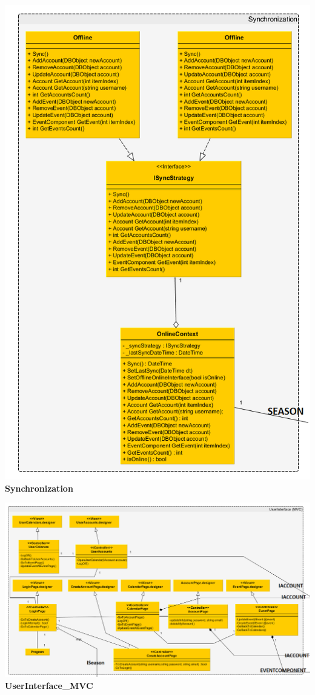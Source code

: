 \documentclass[a4paper]{article}
\begin{document}
\begin{table}
\centering
	\includegraphics[width=1.3\textwidth]{Synchronization.png}\\
\caption{\textbf{Synchronization}}
\end{table}

\begin{table}
\centering
	\includegraphics[width=1.3\textwidth]{UserInterfaceMVC.png}\\
\caption{\textbf{UserInterface\_MVC}}
\end{table}
\end{document}
